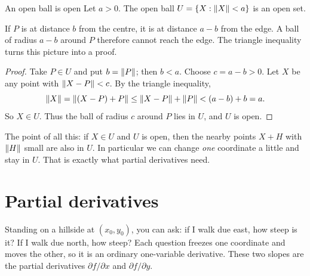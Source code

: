 \begin{theorem}{An open ball is open}
Let $a>0$. The open ball $U=\{X:\left\lVert X\right\rVert<a\}$ is an open set.
\end{theorem}

\begin{intuition}
If $P$ is at distance $b$ from the centre, it is at distance $a-b$ from the edge.
A ball of radius $a-b$ around $P$ therefore cannot reach the edge. The triangle
inequality turns this picture into a proof.
\begin{center}
\end{center}
\end{intuition}



\begin{proof}
Take $P\in U$ and put $b=\left\lVert P\right\rVert$; then $b<a$. Choose $c=a-b>0$. Let $X$ be any point
with $\left\lVert X-P\right\rVert<c$. By the triangle inequality,
\[
 \left\lVert X\right\rVert=\left\lVert (X-P)+P\right\rVert\le\left\lVert X-P\right\rVert+\left\lVert P\right\rVert<(a-b)+b=a .
\]
So $X\in U$. Thus the ball of radius $c$ around $P$ lies in $U$, and $U$ is open.
\end{proof}

The point of all this: if $X\in U$ and $U$ is open, then the nearby points $X+H$ with
$\left\lVert H\right\rVert$ small are also in $U$. In particular we can change \emph{one} coordinate a
little and stay in $U$. That is exactly what partial derivatives need.

\section{Partial derivatives}

\begin{intuition}
Standing on a hillside at $(x_0,y_0)$, you can ask: if I walk due east, how steep is it?
If I walk due north, how steep? Each question freezes one coordinate and moves the
other, so it is an ordinary one-variable derivative. These two slopes are the partial
derivatives $\partial f/\partial x$ and $\partial f/\partial y$.
\end{intuition}

